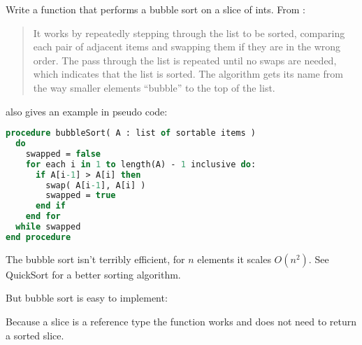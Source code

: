 \begin{Exercise}[title={Bubble sort},difficulty=1]
\label{ex:bubble}
\Question\label{ex:bubble q1} Write a function that performs 
a bubble sort on a slice of ints. From \cite{bubblesort}:
\begin{quote}
It works by repeatedly stepping through the list to be sorted, comparing each
pair of adjacent items and swapping them if they are in the wrong order. The
pass through the list is repeated until no swaps are needed, which indicates
that the list is sorted. The algorithm gets its name from the way smaller
elements ``bubble'' to the top of the list. 
\end{quote}

\cite{bubblesort} also gives an example in pseudo code:
\begin{lstlisting}[language=pascal]
procedure bubbleSort( A : list of sortable items )
  do
    swapped = false
    for each i in 1 to length(A) - 1 inclusive do:
      if A[i-1] > A[i] then
        swap( A[i-1], A[i] )
        swapped = true
      end if
    end for
  while swapped
end procedure
\end{lstlisting}
\end{Exercise}

\begin{Answer}
\Question 
The bubble sort isn't terribly efficient, for $n$ elements it scales
$O(n^2)$. See QuickSort \cite{quicksort} for a better sorting algorithm.

But bubble sort is easy to implement:


Because a slice is a reference type the  function works and
does not need to return a sorted slice.
\end{Answer}
